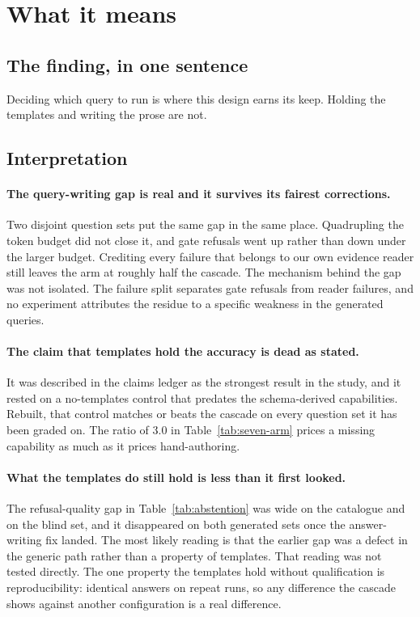 \section{What it means}

\subsection{The finding, in one sentence}

Deciding which query to run is where this design earns its keep. Holding the
templates and writing the prose are not.

\subsection{Interpretation}

\paragraph{The query-writing gap is real and it survives its fairest
corrections.} Two disjoint question sets put the same gap in the same place.
Quadrupling the token budget did not close it, and gate refusals went up rather
than down under the larger budget. Crediting every failure that belongs to our
own evidence reader still leaves the arm at roughly half the cascade. The
mechanism behind the gap was not isolated. The failure split separates gate
refusals from reader failures, and no experiment attributes the residue to a
specific weakness in the generated queries. 

\paragraph{The claim that templates hold the accuracy is dead as stated.} It was
described in the claims ledger as the strongest result in the study, and it
rested on a no-templates control that predates the schema-derived capabilities.
Rebuilt, that control matches or beats the cascade on every question set it has
been graded on. The ratio of 3.0 in Table~\ref{tab:seven-arm} prices a missing
capability as much as it prices hand-authoring. 

\paragraph{What the templates do still hold is less than it first looked.} The
refusal-quality gap in Table~\ref{tab:abstention} was wide on the catalogue and
on the blind set, and it disappeared on both generated sets once the
answer-writing fix landed. The most likely reading is that the earlier gap was a
defect in the generic path rather than a property of templates. That reading was
not tested directly. The one property the templates hold without qualification
is reproducibility: identical answers on repeat runs, so any difference the
cascade shows against another configuration is a real difference.

